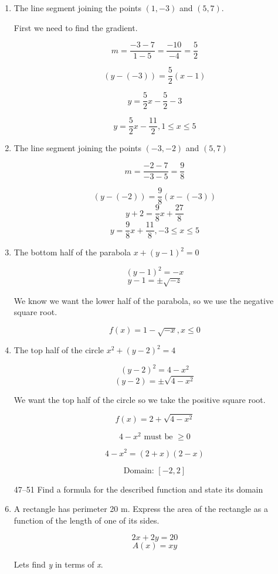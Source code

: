 \documentclass{article}
\begin{document}
\begin{enumerate}
	\item The line segment joining the points $(1, -3)$ and $(5, 7)$.
	
		First we need to find the gradient.
		
		$$m = \frac{-3 - 7}{1 - 5} = \frac{-10}{-4} = \frac{5}{2}$$
		
		$$(y - (-3)) = \frac{5}{2}(x - 1)$$
		
		$$y = \frac{5}{2}x - \frac{5}{2} - 3$$
		
		$$y = \frac{5}{2}x -\frac{11}{2}, 1 \leq x \leq 5$$
		
	\item The line segment joining the points $(-3, -2)$ and $(5, 7)$
	
		$$m = \frac{-2 - 7}{-3 - 5} = \frac{9}{8}$$
	
		$$(y - (-2)) = \frac{9}{8}(x - (-3))$$
		$$y + 2 = \frac{9}{8}x + \frac{27}{8}$$
		$$y = \frac{9}{8}x + \frac{11}{8}, -3 \leq x \leq 5$$
		
	\item The bottom half of the parabola $x + (y-1)^2 = 0$
		
		$$ (y - 1)^2 = -x$$
		$$y - 1 = \pm \sqrt{-z}$$
		
		We know we want the lower half of the parabola, so we use the negative square root.
		
		$$f(x) = 1 - \sqrt{-x}, x \leq 0$$
		
	\item The top half of the circle $x^2 + (y - 2)^2 = 4$
	
		$$ (y - 2)^2 = 4 - x^2$$
		$$ (y - 2) = \pm \sqrt{4 - x^2} $$
		
		We want the top half of the circle so we take the positive square root.
		
		$$ f(x) = 2 + \sqrt{4 - x^2} $$
		
		$$ 4 - x^2 \text{ must be } \geq 0$$
		
		$$4 - x^2 = (2 + x)(2 - x)$$
		
		$$\text{Domain: } [-2, 2]$$
		
	\item[47--51] Find a formula for the described function and state its domain
	
	\item A rectangle has perimeter 20 m. Express the area of the rectangle as a function of the
		length of one of its sides.
		
		$$2x + 2y = 20$$
		$$A(x) = xy$$
		
		Lets find \emph{y} in terms of \emph{x}.
		

\end{enumerate}
\end{document}
